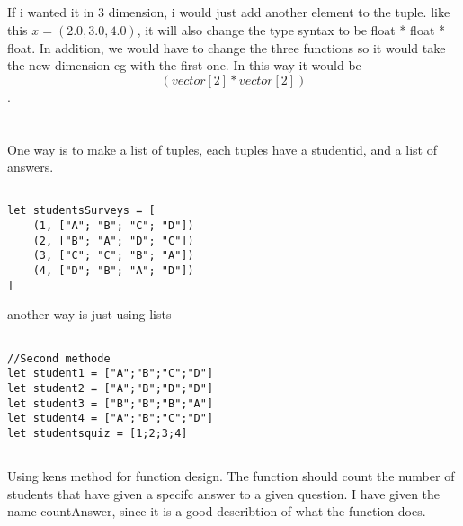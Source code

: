 \documentclass{article}
\begin{document}
\subsection{}

If i wanted it in 3 dimension, i would just add another element to the tuple. like this
$x = (2.0, 3.0, 4.0)$, it will also change the type syntax to be float * float * float. In addition, we would have to change the three functions so it would take the new dimension eg with the first one. In this way it would be $$(vector[2]*vector[2])$$.




\section{}

\subsection{}
One way is to make a list of tuples, each tuples have a studentid, and a list of answers.

    \begin{lstlisting}

let studentsSurveys = [
    (1, ["A"; "B"; "C"; "D"])
    (2, ["B"; "A"; "D"; "C"])
    (3, ["C"; "C"; "B"; "A"])
    (4, ["D"; "B"; "A"; "D"])
]

    \end{lstlisting}


another way is just using lists


    \begin{lstlisting}

//Second methode
let student1 = ["A";"B";"C";"D"]
let student2 = ["A";"B";"D";"D"]
let student3 = ["B";"B";"B";"A"]
let student4 = ["A";"B";"C";"D"]
let studentsquiz = [1;2;3;4]

    \end{lstlisting}





\subsection{}

Using kens method for function design. The function should count the number of students that have given a specifc answer to a given question. I have given the name countAnswer, since it is a good describtion of what the function does.
\end{document}
